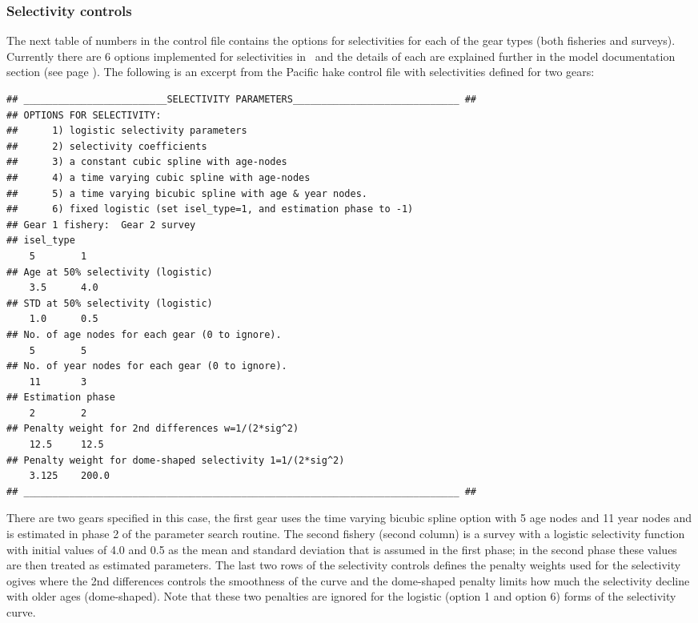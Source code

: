 \begin{multicols}{2}
\subsubsection{Selectivity controls}
The next table of numbers in the control file contains the options for selectivities for each of the gear types (both fisheries and surveys).  Currently there are 6 options implemented for selectivities in \iscam\, and the details of each are explained further in the model documentation section (see page \pageref{ModelDocSelectivity}).  The following is an excerpt from the Pacific hake control file with selectivities defined for two gears:

\begin{tiny}
\begin{verbatim}
## _________________________SELECTIVITY PARAMETERS_____________________________ ##
## OPTIONS FOR SELECTIVITY:
##      1) logistic selectivity parameters
##      2) selectivity coefficients
##      3) a constant cubic spline with age-nodes
##      4) a time varying cubic spline with age-nodes
##      5) a time varying bicubic spline with age & year nodes.
##      6) fixed logistic (set isel_type=1, and estimation phase to -1)
## Gear 1 fishery:  Gear 2 survey
## isel_type
    5        1
## Age at 50% selectivity (logistic)
    3.5      4.0
## STD at 50% selectivity (logistic)
    1.0      0.5
## No. of age nodes for each gear (0 to ignore).
    5        5
## No. of year nodes for each gear (0 to ignore).
    11       3
## Estimation phase
    2        2
## Penalty weight for 2nd differences w=1/(2*sig^2)
    12.5     12.5
## Penalty weight for dome-shaped selectivity 1=1/(2*sig^2)
    3.125    200.0
## ____________________________________________________________________________ ##
\end{verbatim}
\end{tiny}
There are two gears specified in this case, the first gear uses the time varying bicubic spline option with 5 age nodes and 11 year nodes and is estimated in phase 2 of the parameter search routine.  The second fishery (second column) is a survey with a logistic selectivity function with initial values of 4.0 and 0.5 as the mean and standard deviation that is assumed in the first phase; in the second phase these values are then treated as estimated parameters.  The last two rows of the selectivity controls defines the penalty weights used for the selectivity ogives where the 2nd differences controls the smoothness of the curve and the dome-shaped penalty limits how much the selectivity decline with older ages (dome-shaped).  Note that these two penalties are ignored for the logistic (option 1 and option 6) forms of the selectivity curve.



\end{multicols}

